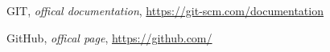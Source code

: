 \begin{thebibliography}{99999}
\singlespace\normalsize

 GIT, \textit{offical documentation}, \url{https://git-scm.com/documentation}

 GitHub, \textit{offical page}, \url{https://github.com/}

\end{thebibliography}
